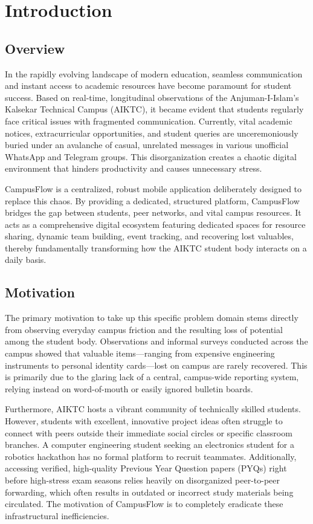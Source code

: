 \chapter{Introduction}

\section{Overview}
In the rapidly evolving landscape of modern education, seamless communication and instant access to academic resources have become paramount for student success. Based on real-time, longitudinal observations of the Anjuman-I-Islam's Kalsekar Technical Campus (AIKTC), it became evident that students regularly face critical issues with fragmented communication. Currently, vital academic notices, extracurricular opportunities, and student queries are unceremoniously buried under an avalanche of casual, unrelated messages in various unofficial WhatsApp and Telegram groups. This disorganization creates a chaotic digital environment that hinders productivity and causes unnecessary stress.

CampusFlow is a centralized, robust mobile application deliberately designed to replace this chaos. By providing a dedicated, structured platform, CampusFlow bridges the gap between students, peer networks, and vital campus resources. It acts as a comprehensive digital ecosystem featuring dedicated spaces for resource sharing, dynamic team building, event tracking, and recovering lost valuables, thereby fundamentally transforming how the AIKTC student body interacts on a daily basis.

\section{Motivation}
The primary motivation to take up this specific problem domain stems directly from observing everyday campus friction and the resulting loss of potential among the student body. Observations and informal surveys conducted across the campus showed that valuable items—ranging from expensive engineering instruments to personal identity cards—lost on campus are rarely recovered. This is primarily due to the glaring lack of a central, campus-wide reporting system, relying instead on word-of-mouth or easily ignored bulletin boards.

Furthermore, AIKTC hosts a vibrant community of technically skilled students. However, students with excellent, innovative project ideas often struggle to connect with peers outside their immediate social circles or specific classroom branches. A computer engineering student seeking an electronics student for a robotics hackathon has no formal platform to recruit teammates. Additionally, accessing verified, high-quality Previous Year Question papers (PYQs) right before high-stress exam seasons relies heavily on disorganized peer-to-peer forwarding, which often results in outdated or incorrect study materials being circulated. The motivation of CampusFlow is to completely eradicate these infrastructural inefficiencies.


